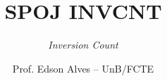 \title{SPOJ INVCNT}
\subtitle{\textit{Inversion Count}}
\author{Prof. Edson Alves -- UnB/FCTE}
\date{}
